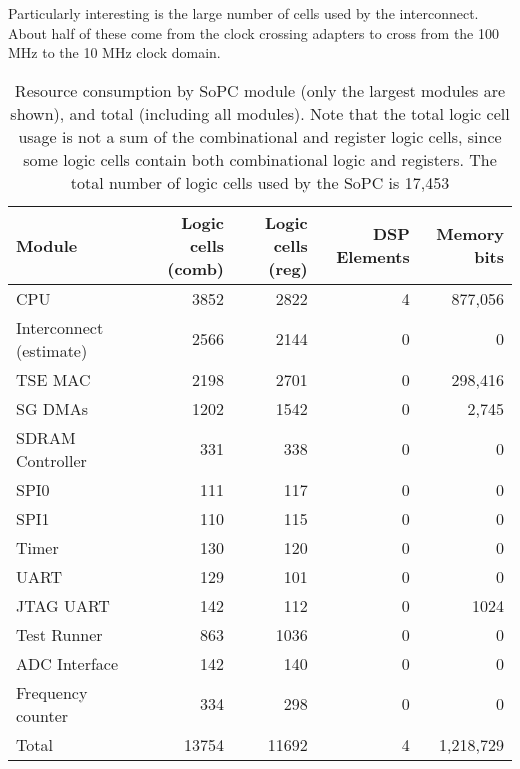 Particularly interesting is the large number of cells used by the interconnect. About half of these
come from the clock crossing adapters to cross from the 100 MHz to the 10 MHz clock domain.

\begin{table}[h!]
\centering
\begin{tabular}{ | p{2cm} | r | r | r | r | }
 \hline
   Module       & Logic cells (comb) & Logic cells (reg) & DSP Elements & Memory bits \\
 \hline
   CPU & 3852 & 2822 & 4 & 877,056 \\
 \hline
   Interconnect (estimate) & 2566 & 2144 & 0 & 0\\
 \hline
   TSE MAC & 2198 & 2701 & 0 & 298,416 \\
 \hline
   SG DMAs & 1202 & 1542 & 0 & 2,745 \\
 \hline
   SDRAM Controller & 331 & 338 & 0 & 0 \\
 \hline
   SPI0 & 111 & 117 & 0 & 0 \\
 \hline
   SPI1 & 110 & 115 & 0 & 0 \\
\hline
   Timer & 130 & 120 & 0 & 0 \\
\hline
   UART & 129 & 101 & 0 & 0 \\
\hline
   JTAG UART & 142 & 112 & 0 & 1024 \\
\hline
   Test Runner & 863 & 1036 & 0 & 0 \\
\hline
   ADC Interface & 142 & 140 & 0 & 0 \\
 \hline
   Frequency counter & 334 & 298 & 0 & 0 \\
 \hline
 \hline
   Total & 13754 & 11692 & 4 & 1,218,729 \\
 \hline
\end{tabular}
\caption{Resource consumption by SoPC module (only the largest modules are shown), and total (including all modules). Note that the total logic cell usage is not a sum of the combinational and register logic cells, since some logic cells contain both combinational logic and registers. The total number of logic cells used by the SoPC is 17,453}
\label{table:linuxsys_resusage}
\end{table}



